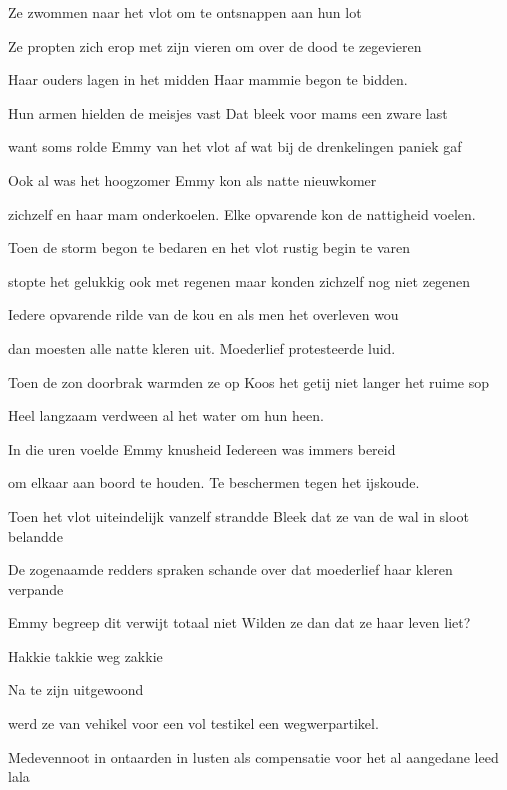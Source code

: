 Ze zwommen naar het vlot
om te ontsnappen aan hun lot

Ze propten zich erop met zijn vieren
om over de dood te zegevieren

Haar ouders lagen in het midden
Haar mammie begon te bidden.

Hun armen hielden de meisjes vast
Dat bleek voor mams een zware  last

want soms rolde Emmy van het vlot af
wat bij de drenkelingen paniek gaf

Ook al was het hoogzomer
Emmy kon als natte nieuwkomer

zichzelf en haar mam onderkoelen.
Elke opvarende kon de nattigheid voelen.

Toen de storm begon te bedaren
en het vlot rustig begin te varen

stopte het gelukkig ook met regenen
maar konden zichzelf nog niet zegenen

Iedere opvarende rilde van de kou
en als men het overleven wou

dan moesten alle natte kleren uit.
Moederlief protesteerde luid.

Toen de zon doorbrak warmden ze op
Koos het getij niet langer het ruime sop

Heel langzaam verdween
al het water om hun heen.

In die uren voelde Emmy knusheid
Iedereen was immers bereid

om elkaar aan boord te houden.
Te beschermen tegen het ijskoude.

Toen het vlot uiteindelijk vanzelf strandde
Bleek dat ze van de wal in sloot belandde

De zogenaamde redders spraken schande
over dat moederlief haar kleren verpande

Emmy begreep dit verwijt totaal niet
Wilden ze dan dat ze haar leven liet?

Hakkie takkie weg zakkie

Na te zijn uitgewoond

werd ze van vehikel
voor een vol testikel
een wegwerpartikel.

Medevennoot in ontaarden in lusten als compensatie voor het al aangedane leed
lala

